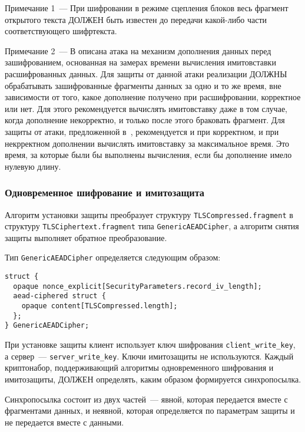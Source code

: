 \begin{note}
Примечание 1~--- При шифровании в режиме сцепления блоков весь фрагмент 
открытого текста ДОЛЖЕН быть известен до передачи какой-либо части 
соответствующего шифртекста.
\end{note}

\begin{note}
Примечание 2~--- В \cite{PwdInterception} описана атака на механизм 
дополнения данных перед зашифрованием, основанная на замерах времени 
вычисления имитовставки расшифрованных данных. Для защиты от данной атаки 
реализации ДОЛЖНЫ обрабатывать зашифрованные фрагменты данных за одно и то 
же время, вне зависимости от того, какое дополнение получено при 
расшифровании, корректное или нет. Для этого рекомендуется вычислять 
имитовставку даже в том случае, когда дополнение некорректно, и только 
после этого браковать фрагмент. Для защиты от атаки, предложенной в~\cite{Lucky13}, 
рекомендуется и при корректном, и при некрректном дополнении вычислять 
имитовставку за максимальное время. Это время, за которые были бы 
выполнены вычисления, если бы дополнение имело нулевую длину. 
\end{note}

\subsubsection{Одновременное шифрование и имитозащита}\label{RECORD.3.3.3}

Алгоритм установки защиты преобразует структуру 
\lstinline{TLSCompressed.fragment} в структуру 
\lstinline{TLSCiphertext.fragment} типа \lstinline{GenericAEADCipher}, а 
алгоритм снятия защиты выполняет обратное преобразование. 

Тип \lstinline{GenericAEADCipher} определяется следующим образом:
\begin{lstlisting}
struct {
  opaque nonce_explicit[SecurityParameters.record_iv_length];
  aead-ciphered struct {
    opaque content[TLSCompressed.length];
  };
} GenericAEADCipher;
\end{lstlisting}

При установке защиты клиент использует ключ шифрования \lstinline{client_write_key}, 
а сервер~--- \lstinline{server_write_key}. Ключи имитозащиты не используются. 
Каждый криптонабор, поддерживающий алгоритмы одновременного шифрования и 
имитозащиты, ДОЛЖЕН определять, каким образом формируется синхропосылка. 

Синхропосылка состоит из двух частей~--- явной, которая передается вместе с 
фрагментами данных, и неявной, которая определяется по параметрам защиты 
и не передается вместе с данными.   


